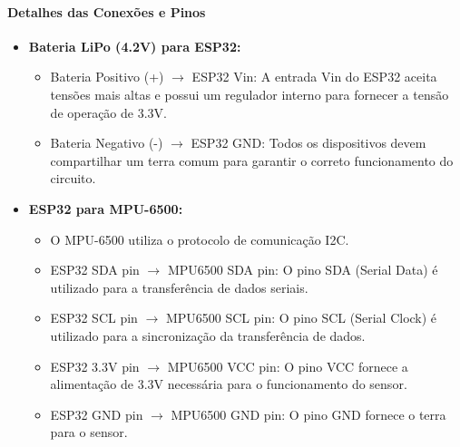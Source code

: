 \paragraph{Detalhes das Conexões e Pinos}

\begin{itemize}
    \item   \textbf{Bateria LiPo (4.2V) para ESP32:}
    \begin{itemize}
        \item   Bateria Positivo (+) $\rightarrow$ ESP32 Vin: A entrada Vin do ESP32 aceita tensões mais altas e possui um regulador interno para fornecer a tensão de operação de 3.3V.
        \item   Bateria Negativo (-) $\rightarrow$ ESP32 GND: Todos os dispositivos devem compartilhar um terra comum para garantir o correto funcionamento do circuito.
    \end{itemize}

    \item   \textbf{ESP32 para MPU-6500:}
    \begin{itemize}
        \item   O MPU-6500 utiliza o protocolo de comunicação I2C.
        \item   ESP32 SDA pin $\rightarrow$ MPU6500 SDA pin: O pino SDA (Serial Data) é utilizado para a transferência de dados seriais.
        \item   ESP32 SCL pin $\rightarrow$ MPU6500 SCL pin: O pino SCL (Serial Clock) é utilizado para a sincronização da transferência de dados.
        \item   ESP32 3.3V pin $\rightarrow$ MPU6500 VCC pin: O pino VCC fornece a alimentação de 3.3V necessária para o funcionamento do sensor.
        \item   ESP32 GND pin $\rightarrow$ MPU6500 GND pin: O pino GND fornece o terra para o sensor.
    \end{itemize}


\end{itemize}
